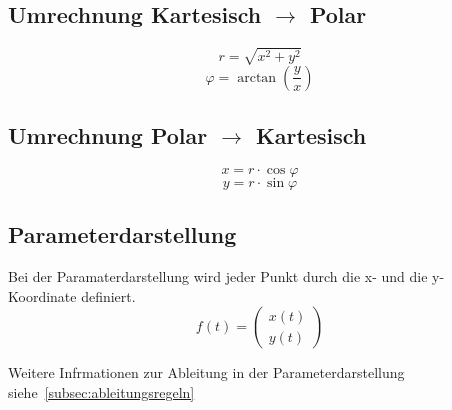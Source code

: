 \subsection{Umrechnung Kartesisch $\rightarrow$ Polar}
\[ \boxed{r = \sqrt{x^2 + y^2}} \]
\[ \boxed{\varphi = \arctan\left(\frac{y}{x}\right)} \]

\subsection{Umrechnung Polar $\rightarrow$ Kartesisch}
\[ \boxed{x = r \cdot \cos{\varphi}} \]
\[ \boxed{y = r \cdot \sin{\varphi}} \]

\subsection{Parameterdarstellung}
Bei der Paramaterdarstellung wird jeder Punkt durch die x- und die y-Koordinate definiert. 
\[ \boxed{f(t) = \left(\begin{matrix} x(t)\\ y(t) \end{matrix}\right)} \] 

\noindent 
Weitere Infrmationen zur Ableitung in der Parameterdarstellung siehe~\ref{subsec:ableitungsregeln}
